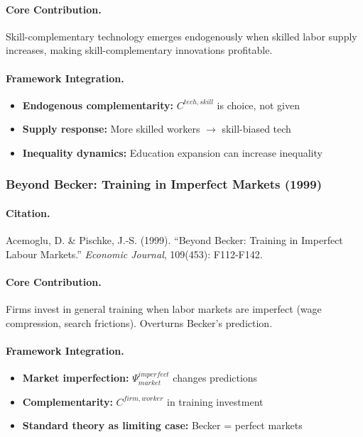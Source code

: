 \paragraph{Core Contribution.}
Skill-complementary technology emerges endogenously when skilled labor
supply increases, making skill-complementary innovations profitable.

\paragraph{Framework Integration.}
\begin{itemize}
  \item \textbf{Endogenous complementarity:} $C^{tech,skill}$ is choice, not given
  \item \textbf{Supply response:} More skilled workers $\to$ skill-biased tech
  \item \textbf{Inequality dynamics:} Education expansion can increase inequality
\end{itemize}

\subsubsection{Beyond Becker: Training in Imperfect Markets (1999)}

\paragraph{Citation.}
Acemoglu, D. \& Pischke, J.-S. (1999).
``Beyond Becker: Training in Imperfect Labour Markets.''
\emph{Economic Journal}, 109(453): F112-F142.

\paragraph{Core Contribution.}
Firms invest in general training when labor markets are imperfect
(wage compression, search frictions). Overturns Becker's prediction.

\paragraph{Framework Integration.}
\begin{itemize}
  \item \textbf{Market imperfection:} $\Psi_{market}^{imperfect}$ changes predictions
  \item \textbf{Complementarity:} $C^{firm,worker}$ in training investment
  \item \textbf{Standard theory as limiting case:} Becker = perfect markets
\end{itemize}

